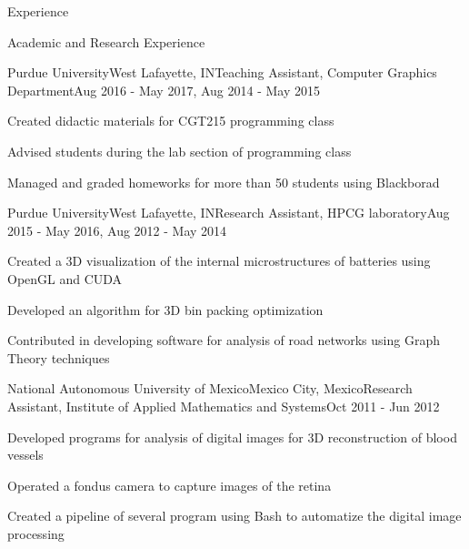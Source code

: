 \documentclass{resume} %
\begin{document}
\begin{rSection}{Experience}

\end{rSection}

\clearpage



\begin{rSection}{Academic and Research Experience}

	\begin{rSubsection}{Purdue University}{West Lafayette, IN}{Teaching Assistant, Computer Graphics Department}{Aug 2016 - May 2017, Aug 2014 - May 2015}
	\item Created didactic materials for CGT215 programming class
	\item Advised students during the lab section of programming class
	\item Managed and graded homeworks for more than 50 students using Blackborad
	\end{rSubsection}

	\begin{rSubsection}{Purdue University}{West Lafayette, IN}{Research Assistant, HPCG laboratory}{Aug 2015 - May 2016, Aug 2012 - May 2014}
	\item Created a 3D visualization of the internal microstructures of batteries using OpenGL and CUDA
	\item Developed an algorithm for 3D bin packing optimization
	\item Contributed in developing software for analysis of road networks using Graph Theory techniques
	\end{rSubsection}
	
	\begin{rSubsection}{National Autonomous University of Mexico}{Mexico City, Mexico}{Research Assistant, Institute of Applied Mathematics and Systems}{Oct 2011 - Jun 2012}
	\item Developed programs for analysis of digital images for 3D reconstruction of blood vessels
	\item Operated a fondus camera to capture images of the retina
	\item Created a pipeline of several program using Bash to automatize the digital image processing
	\end{rSubsection}
	

\end{rSection}
\end{document}
